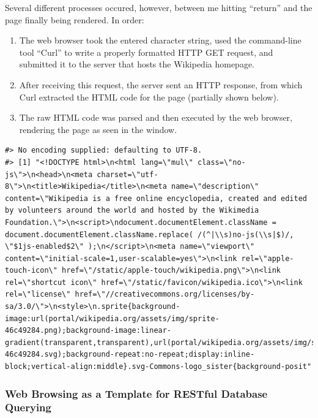 \documentclass[
]{book}
\begin{document}
Several different processes occured, however, between me hitting ``return'' and the page finally being rendered. In order:

\begin{enumerate}
\def\labelenumi{\arabic{enumi}.}
\item
  The web browser took the entered character string, used the command-line tool ``Curl'' to write a properly formatted HTTP GET request, and submitted it to the server that hosts the Wikipedia homepage.
\item
  After receiving this request, the server sent an HTTP response, from which Curl extracted the HTML code for the page (partially shown below).
\item
  The raw HTML code was parsed and then executed by the web browser, rendering the page as seen in the window.
\end{enumerate}

\begin{verbatim}
#> No encoding supplied: defaulting to UTF-8.
#> [1] "<!DOCTYPE html>\n<html lang=\"mul\" class=\"no-js\">\n<head>\n<meta charset=\"utf-8\">\n<title>Wikipedia</title>\n<meta name=\"description\" content=\"Wikipedia is a free online encyclopedia, created and edited by volunteers around the world and hosted by the Wikimedia Foundation.\">\n<script>\ndocument.documentElement.className = document.documentElement.className.replace( /(^|\\s)no-js(\\s|$)/, \"$1js-enabled$2\" );\n</script>\n<meta name=\"viewport\" content=\"initial-scale=1,user-scalable=yes\">\n<link rel=\"apple-touch-icon\" href=\"/static/apple-touch/wikipedia.png\">\n<link rel=\"shortcut icon\" href=\"/static/favicon/wikipedia.ico\">\n<link rel=\"license\" href=\"//creativecommons.org/licenses/by-sa/3.0/\">\n<style>\n.sprite{background-image:url(portal/wikipedia.org/assets/img/sprite-46c49284.png);background-image:linear-gradient(transparent,transparent),url(portal/wikipedia.org/assets/img/sprite-46c49284.svg);background-repeat:no-repeat;display:inline-block;vertical-align:middle}.svg-Commons-logo_sister{background-posit"
\end{verbatim}

\hypertarget{web-browsing-as-a-template-for-restful-database-querying}{%
\subsubsection*{Web Browsing as a Template for RESTful Database Querying}\label{web-browsing-as-a-template-for-restful-database-querying}}
\end{document}

